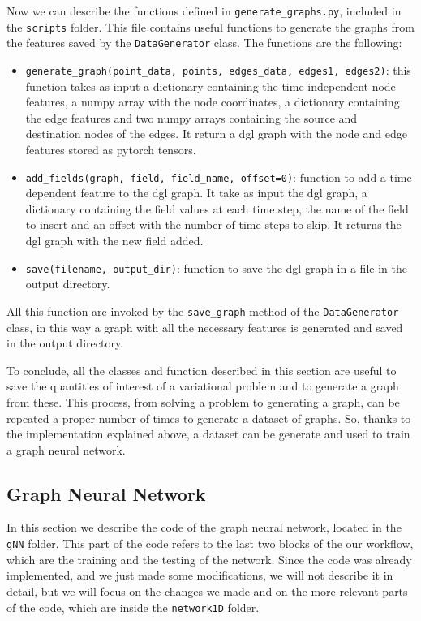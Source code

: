 \documentclass[11pt,a4paper]{article}
\begin{document}
Now we can describe the functions defined in \texttt{generate\_graphs.py}, included in the \texttt{scripts} folder. This file contains useful functions to generate the graphs from the features saved by the \texttt{DataGenerator} class.
The functions are the following: 
\begin{itemize}
    \item \texttt{generate\_graph(point\_data, points, edges\_data, edges1, edges2)}: this function takes as input a dictionary containing the time independent node features, a numpy array with the node coordinates, a dictionary containing the edge features and two numpy arrays containing the source and destination nodes of the edges. It return a dgl graph with the node and edge features stored as pytorch tensors.
    \item \texttt{add\_fields(graph, field, field\_name, offset=0)}: function to add a time dependent feature to the dgl graph. It take as input the dgl graph, a dictionary containing the field values at each time step, the name of the field to insert and an offset with the number of time steps to skip. It returns the dgl graph with the new field added.
    \item \texttt{save(filename, output\_dir)}: function to save the dgl graph in a file in the output directory.
\end{itemize}

All this function are invoked by the \texttt{save\_graph} method of the \texttt{DataGenerator} class, in this way a graph with all the necessary features is generated and saved in the output directory.

To conclude, all the classes and function described in this section are useful to save the quantities of interest of a variational problem and to generate a graph from these. This process, from solving a problem to generating a graph, can be repeated a proper number of times to generate a dataset of graphs. 
So, thanks to the implementation explained above, a dataset can be generate and used to train a graph neural network.

\subsection{Graph Neural Network}
\label{gnn}

In this section we describe the code of the graph neural network, located in the \texttt{gNN} folder. This part of the code refers to the last two blocks of the our workflow, which are the training and the testing of the network.
Since the code was already implemented, and we just made some modifications, we will not describe it in detail, but we will focus on the changes we made and on the more relevant parts of the code, which are inside the \texttt{network1D} folder.
\end{document}
